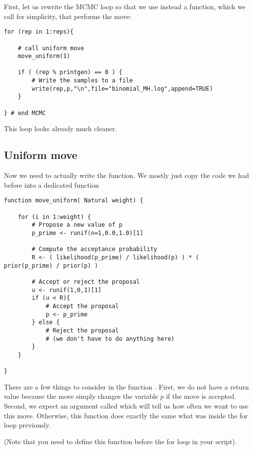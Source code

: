 First, let us rewrite the MCMC loop so that we use instead a function, which we call  for simplicity, that performs the move:
{\tt \begin{snugshade*}
\begin{lstlisting}    
for (rep in 1:reps){
    
    # call uniform move
    move_uniform(1)
    
    if ( (rep % printgen) == 0 ) {
        # Write the samples to a file
        write(rep,p,"\n",file="binomial_MH.log",append=TRUE)
    }

} # end MCMC
\end{lstlisting}
\end{snugshade*}}
This loop looks already much cleaner.

\subsection{Uniform move}
Now we need to actually write the  function.
We mostly just copy the code we had before into a dedicated function
{\tt \begin{snugshade*}
\begin{lstlisting}    
function move_uniform( Natural weight) {

    for (i in 1:weight) {
        # Propose a new value of p
        p_prime <- runif(n=1,0.0,1.0)[1]

        # Compute the acceptance probability
        R <- ( likelihood(p_prime) / likelihood(p) ) * ( prior(p_prime) / prior(p) )
    
        # Accept or reject the proposal
        u <- runif(1,0,1)[1]
        if (u < R){
            # Accept the proposal
            p <- p_prime
        } else {
            # Reject the proposal
            # (we don't have to do anything here)
        }
    }
    
}
\end{lstlisting}
\end{snugshade*}}
There are a few things to consider in the function .
First, we do not have a return value because the move simply changes the variable $p$ if the move is accepted.
Second, we expect an argument called  which will tell us how often we want to use this move.
Otherwise, this function does exactly the same what was inside the for loop previously.

(Note that you need to define this function before the for loop in your script).


